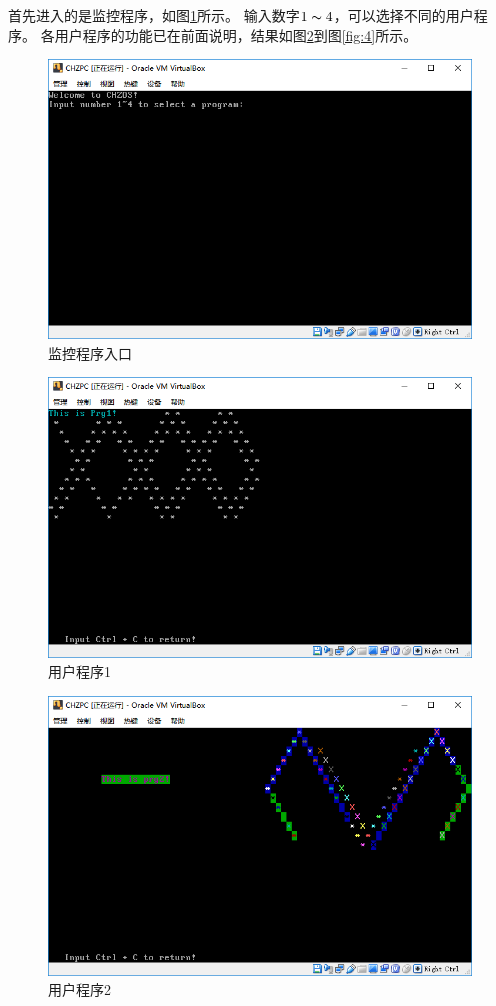 \documentclass[logo,reportComp]{thesis}
\begin{document}
首先进入的是监控程序，如图\ref{fig:monitor}所示。
输入数字$1\thicksim 4$，可以选择不同的用户程序。
各用户程序的功能已在前面说明，结果如图\ref{fig:1}到图\ref{fig:4}所示。
\begin{figure}[H]
\centering
\includegraphics[width=\linewidth]{fig/monitor.PNG}
\caption{监控程序入口}
\label{fig:monitor}
\end{figure}
\begin{figure}[H]
\centering
\includegraphics[width=\linewidth]{fig/prg1.PNG}
\caption{用户程序1}
\label{fig:1}
\end{figure}
\begin{figure}[H]
\centering
\includegraphics[width=\linewidth]{fig/prg2.PNG}
\caption{用户程序2}
\label{fig:2}
\end{figure}
\end{document}
